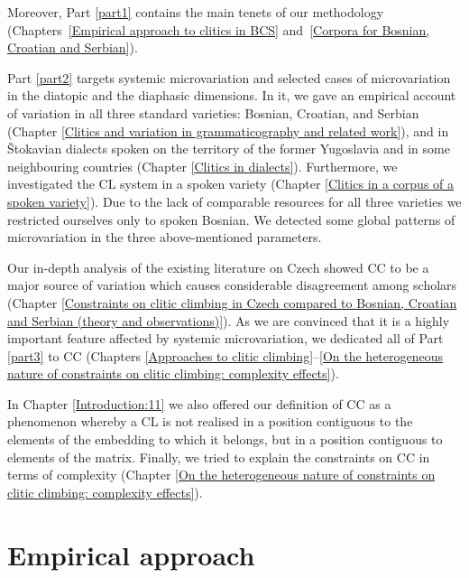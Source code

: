 Moreover, Part \ref{part1} contains the main tenets of our methodology (Chapters~\ref{Empirical approach to clitics in BCS} and~\ref{Corpora for Bosnian, Croatian and Serbian}).


Part \ref{part2} targets systemic microvariation and selected cases of microvariation in the diatopic and the diaphasic dimensions. In it, we gave an empirical account of variation in all three standard varieties: Bosnian, Croatian, and Serbian (Chapter \ref{Clitics and variation in grammaticography and related work}), and in Štokavian dialects spoken on the territory of the former Yugoslavia and in some neighbouring countries (Chapter \ref{Clitics in dialects}). Furthermore, we investigated the CL system in a spoken variety (Chapter \ref{Clitics in a corpus of a spoken variety}). Due to the lack of comparable resources for all three varieties we restricted ourselves only to spoken Bosnian. We detected some global patterns of microvariation in the three above-mentioned parameters. 



Our in-depth analysis of the existing literature on Czech showed CC to be a major source of variation which causes considerable disagreement among scholars (Chapter \ref{Constraints on clitic climbing in Czech compared to Bosnian, Croatian and Serbian (theory and observations)}). As we are convinced that it is a highly important feature affected by systemic microvariation, we dedicated all of Part \ref{part3} to CC (Chapters \ref{Approaches to clitic climbing}--\ref{On the heterogeneous nature of constraints on clitic climbing: complexity effects}). 

In Chapter \ref{Introduction:11} we also offered our definition of CC as a phenomenon whereby a CL is not realised in a position contiguous to the elements of the embedding to which it belongs, but in a position contiguous to elements of the matrix. Finally, we tried to explain the constraints on CC in terms of complexity (Chapter \ref{On the heterogeneous nature of constraints on clitic climbing: complexity effects}).



\section{Empirical approach}



